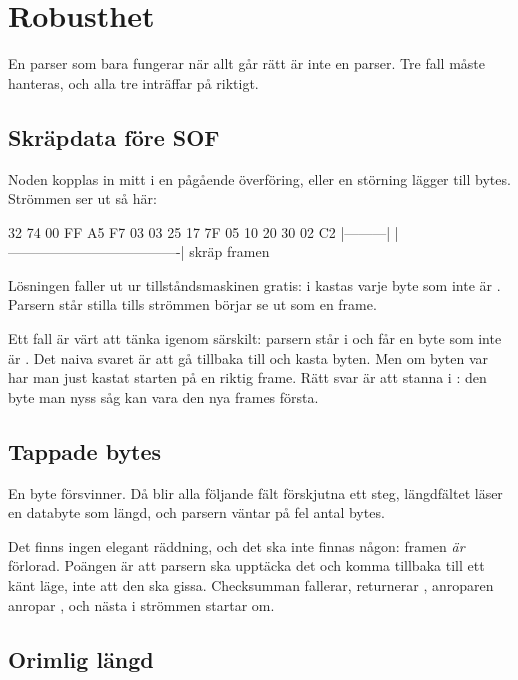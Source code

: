 \section{Robusthet}
\label{sec:robust}

En parser som bara fungerar när allt går rätt är inte en parser. Tre fall måste hanteras, och alla
tre inträffar på riktigt.

\subsection{Skräpdata före SOF}

Noden kopplas in mitt i en pågående överföring, eller en störning lägger till bytes. Strömmen ser
ut så här:

\begin{console}
32 74 00 FF A5 F7 03 03 25 17 7F 05 10 20 30 02 C2
|---------| |-------------------------------------|
  skräp                    framen
\end{console}

Lösningen faller ut ur tillståndsmaskinen gratis: i  kastas varje byte som inte
är . Parsern står stilla tills strömmen börjar se ut som en frame.

Ett fall är värt att tänka igenom särskilt: parsern står i  och får en byte som
inte är . Det naiva svaret är att gå tillbaka till  och kasta byten.
Men om byten var  har man just kastat starten på en riktig frame. Rätt svar är att
stanna i : den byte man nyss såg kan vara den nya frames första.

\subsection{Tappade bytes}

En byte försvinner. Då blir alla följande fält förskjutna ett steg, längdfältet läser en databyte
som längd, och parsern väntar på fel antal bytes.

Det finns ingen elegant räddning, och det ska inte finnas någon: framen \emph{är} förlorad.
Poängen är att parsern ska upptäcka det och komma tillbaka till ett känt läge, inte att den ska
gissa. Checksumman fallerar,  returnerar , anroparen anropar
, och nästa  i strömmen startar om.

\subsection{Orimlig längd}


